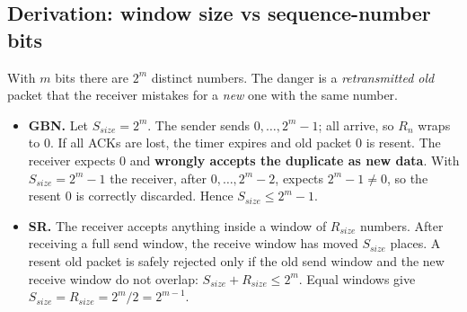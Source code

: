 \subsection*{Derivation: window size vs sequence-number bits}
With $m$ bits there are $2^m$ distinct numbers. The danger is a \emph{retransmitted old} packet that the receiver mistakes for a \emph{new} one with the same number.
\begin{itemize}
  \item \textbf{GBN.} Let $S_{size}=2^m$. The sender sends $0,\ldots,2^m-1$; all arrive, so $R_n$ wraps to 0. If all ACKs are lost, the timer expires and old packet 0
        is resent. The receiver expects 0 and \textbf{wrongly accepts the duplicate as new data}. With $S_{size}=2^m-1$ the receiver, after
        $0,\ldots,2^m-2$, expects $2^m-1\neq0$, so the resent 0 is correctly discarded. Hence $S_{size}\le 2^m-1$.
  \item \textbf{SR.} The receiver accepts anything inside a window of $R_{size}$ numbers. After receiving a full send window, the receive window has moved
        $S_{size}$ places. A resent old packet is safely rejected only if the old send window and the new receive window do not overlap:
        $S_{size}+R_{size}\le 2^m$. Equal windows give $S_{size}=R_{size}=2^{m}/2=2^{m-1}$. 
\end{itemize}


